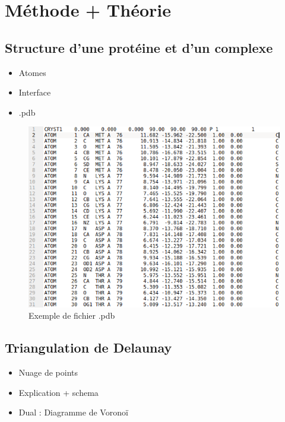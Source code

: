 \chapter{Méthode + Théorie}

\section{Structure d'une protéine et d'un complexe}
\begin{itemize}
  \item Atomes
  \item Interface
  \item .pdb
\end{itemize}

\begin{figure}[ht]
  \includegraphics[width=\textwidth]{figures/pdb_example.png}
  \caption{Exemple de fichier .pdb}
  \label{fig::pdb_file}
\end{figure}

\section{Triangulation de Delaunay}
\begin{itemize}
  \item Nuage de points
  \item Explication + schema
  \item Dual : Diagramme de Voronoï
\end{itemize}


